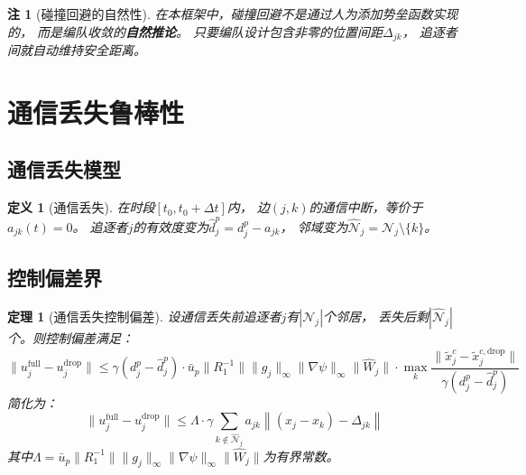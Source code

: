 \documentclass[11pt,a4paper]{article}
\newtheorem{theorem}{定理}
\newtheorem{definition}{定义}
\newtheorem{remark}{注}
\newcommand{\norm}[1]{\left\|#1\right\|}
\newcommand{\ub}{\bar{u}}
\begin{document}
\begin{remark}[碰撞回避的自然性]
  在本框架中，碰撞回避不是通过人为添加势垒函数实现的，
  而是编队收敛的\textbf{自然推论}。
  只要编队设计包含非零的位置间距$\Delta_{jk}$，
  追逐者间就自动维持安全距离。
\end{remark}


\section{通信丢失鲁棒性}

\subsection{通信丢失模型}

\begin{definition}[通信丢失]
  在时段$[t_0, t_0 + \Delta t]$内，
  边$(j,k)$的通信中断，等价于$a_{jk}(t) = 0$。
  追逐者$j$的有效度变为$\hat{d}_j^p = d_j^p - a_{jk}$，
  邻域变为$\hat{\mathcal{N}}_j = \mathcal{N}_j \setminus \{k\}$。
\end{definition}

\subsection{控制偏差界}

\begin{theorem}[通信丢失控制偏差]\label{thm:dropout}
  设通信丢失前追逐者$j$有$|\mathcal{N}_j|$个邻居，
  丢失后剩$|\hat{\mathcal{N}}_j|$个。则控制偏差满足：
  \begin{equation}\label{eq:dropout_bound}
    \|u_j^{\text{full}} - u_j^{\text{drop}}\| \leq
    \gamma (d_j^p - \hat{d}_j^p) \cdot
    \ub_p \|R_1^{-1}\| \|g_j\|_\infty
    \|\nabla\psi\|_\infty \|\hat{W}_j\|
    \cdot \max_k \frac{\|\tilde{x}_j^c - \tilde{x}_j^{c,\text{drop}}\|}
    {\gamma(d_j^p - \hat{d}_j^p)}
  \end{equation}
  简化为：
  \begin{equation}
    \|u_j^{\text{full}} - u_j^{\text{drop}}\| \leq
    \Lambda \cdot \gamma \sum_{k \notin \hat{\mathcal{N}}_j} a_{jk}
    \norm{(x_j - x_k) - \Delta_{jk}}
  \end{equation}
  其中$\Lambda = \ub_p \|R_1^{-1}\| \|g_j\|_\infty
  \|\nabla\psi\|_\infty \|\hat{W}_j\|$为有界常数。
\end{theorem}
\end{document}
